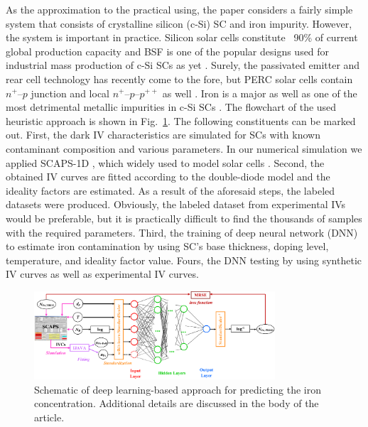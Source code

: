 \documentclass[num-refs]{wiley-article} %
\begin{document}
As the approximation to the practical using, the paper considers a fairly simple system
that consists of crystalline silicon (c-Si) SC  and iron impurity.
However, the system is important in practice.
Silicon solar cells constitute ~90\% of current global production capacity \cite{SCRev2015} and
BSF  is one of  the popular designs used for industrial mass production of c-Si SCs as yet \cite{SCRev2020,GreenRew2019}.
Surely, the passivated emitter and rear cell technology has
recently come to the fore, but PERC solar cells contain $n^+$--$p$ junction 
and local $n^+$--$p$--$p^{++}$ as well \cite{GreenRew2019,WilsonRew2020}.
Iron is a major as well as one of the most detrimental metallic impurities in c-Si SCs \cite{ZHU2016192,FeB:Schmidt,IronSC}.
The flowchart of the used heuristic approach is shown in Fig.~\ref{fig_chem}.
The following constituents can be marked out.
First, the dark IV characteristics are simulated for SCs with known contaminant composition and various parameters.
In our numerical simulation we applied SCAPS-1D \cite{SCAPS1,SCAPS2},
which widely used to model solar cells \cite{SCAPSuseSi4,SCAPSuseSi1,SCAPSuseSi6,SCAPSuse1,SCAPSuse2020,SCAPSuse2017SM}.
Second, the obtained IV curves are fitted according to the double-diode model and the ideality factors are estimated.
As a result of the aforesaid steps, the labeled datasets were produced.
Obviously, the labeled dataset from experimental IVs  would be preferable,
but it is practically difficult to find the thousands of samples with the required parameters.
Third, the training of deep neural network (DNN) to estimate iron contamination  by using SC's base thickness, doping level,
temperature, and ideality factor value.
Fours, the DNN testing by using synthetic IV curves as well as experimental IV curves.

\begin{figure}
\centering
\includegraphics[width=0.8\textwidth]{Chem}
\caption{Schematic of deep learning-based approach  for predicting the iron concentration.
Additional details are discussed in the body of the article.}
\label{fig_chem}
\end{figure}
\end{document}
